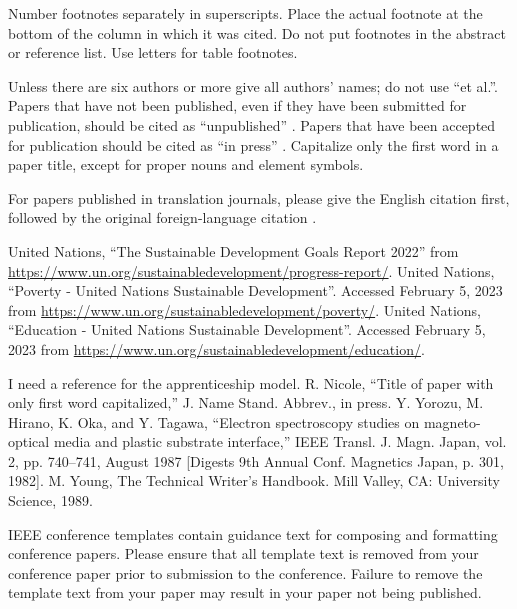 \documentclass[conference]{IEEEtran}
\begin{document}
Number footnotes separately in superscripts. Place the actual footnote at 
the bottom of the column in which it was cited. Do not put footnotes in the 
abstract or reference list. Use letters for table footnotes.

Unless there are six authors or more give all authors' names; do not use 
``et al.''. Papers that have not been published, even if they have been 
submitted for publication, should be cited as ``unpublished'' \cite{b4}. Papers 
that have been accepted for publication should be cited as ``in press'' \cite{b5}. 
Capitalize only the first word in a paper title, except for proper nouns and 
element symbols.

For papers published in translation journals, please give the English 
citation first, followed by the original foreign-language citation \cite{b6}.

\begin{thebibliography}{00}
   United Nations, ``The Sustainable Development Goals Report 2022'' from \url{https://www.un.org/sustainabledevelopment/progress-report/}.
   United Nations, ``Poverty - United Nations Sustainable Development''. Accessed February 5, 2023 from \url{https://www.un.org/sustainabledevelopment/poverty/}.
   United Nations, ``Education - United Nations Sustainable Development''. Accessed February 5, 2023 from \url{https://www.un.org/sustainabledevelopment/education/}.

  
 I need a reference for the apprenticeship model.
 R. Nicole, ``Title of paper with only first word capitalized,'' J. Name Stand. Abbrev., in press.
 Y. Yorozu, M. Hirano, K. Oka, and Y. Tagawa, ``Electron spectroscopy studies on magneto-optical media and plastic substrate interface,'' IEEE Transl. J. Magn. Japan, vol. 2, pp. 740--741, August 1987 [Digests 9th Annual Conf. Magnetics Japan, p. 301, 1982].
 M. Young, The Technical Writer's Handbook. Mill Valley, CA: University Science, 1989.
\end{thebibliography}
\vspace{12pt}
\color{red}
IEEE conference templates contain guidance text for composing and formatting conference papers. Please ensure that all template text is removed from your conference paper prior to submission to the conference. Failure to remove the template text from your paper may result in your paper not being published.
\end{document}
